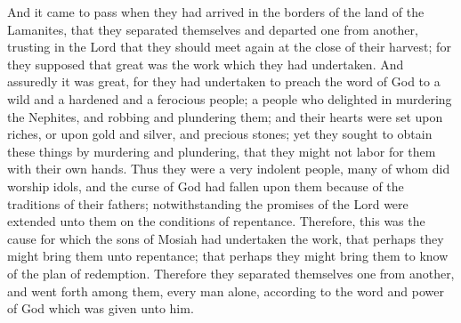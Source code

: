 And it came to pass when they had arrived in the borders of the land of the Lamanites, that they separated themselves and departed one from another, trusting in the Lord that they should meet again at the close of their harvest; for they supposed that great was the work which they had undertaken.
\bverse \iffalse And assuredly it was great, for they had undertaken to preach the word of God to a wild and a hardened and a ferocious people; a people who delighted in murdering the Nephites, and robbing and plundering them; and their hearts were set upon riches, or upon gold and silver, and precious stones; yet they sought to obtain these things by murdering and plundering, that they might not labor for them with their own hands. \fi
And assuredly it was great, for they had undertaken to preach the word of God to a wild and a hardened and a ferocious people; a people who delighted in murdering the Nephites, and robbing and plundering them; and their hearts were set upon riches, or upon gold and silver, and precious stones; yet they sought to obtain these things by murdering and plundering, that they might not labor for them with their own hands.
\bverse \iffalse Thus they were a very indolent people, many of whom did worship idols, and the curse of God had fallen upon them because of the traditions of their fathers; notwithstanding the promises of the Lord were extended unto them on the conditions of repentance. \fi
Thus they were a very indolent people, many of whom did worship idols, and the curse of God had fallen upon them because of the traditions of their fathers; notwithstanding the promises of the Lord were extended unto them on the conditions of repentance.
\bverse \iffalse Therefore, this was the cause for which the sons of Mosiah had undertaken the work, that perhaps they might bring them unto repentance; that perhaps they might bring them to know of the plan of redemption. \fi
Therefore, this was the cause for which the sons of Mosiah had undertaken the work, that perhaps they might bring them unto repentance; that perhaps they might bring them to know of the plan of redemption.
\bverse \iffalse Therefore they separated themselves one from another, and went forth among them, every man alone, according to the word and power of God which was given unto him. \fi
Therefore they separated themselves one from another, and went forth among them, every man alone, according to the word and power of God which was given unto him.
\bverse \iffalse Now Ammon being the chief among them, or rather he did administer unto them, and he departed from them, after having blessed them according to their several stations, having imparted the word of God unto them, or administered unto them before his departure; and thus they took their several journeys throughout the land. \fi

